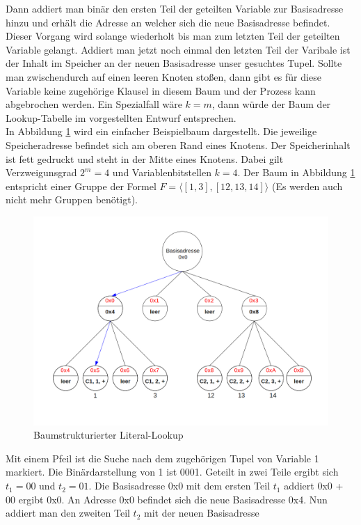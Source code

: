 Dann addiert man binär den ersten Teil der geteilten Variable zur Basisadresse hinzu und erhält
die Adresse an welcher sich die neue Basisadresse befindet. Dieser Vorgang wird solange wiederholt
bis man zum letzten Teil der geteilten Variable gelangt. Addiert man jetzt noch einmal den
letzten Teil der Varibale ist
der Inhalt im Speicher an der neuen Basisadresse unser gesuchtes Tupel. Sollte man zwischendurch auf einen 
leeren Knoten stoßen, dann gibt es für diese Variable keine zugehörige Klausel in diesem Baum
und der Prozess kann abgebrochen werden. Ein Spezialfall wäre $k = m$, dann
würde der Baum der Lookup-Tabelle im vorgestellten Entwurf entsprechen.\\
In Abbildung \ref{tree} wird ein einfacher Beispielbaum dargestellt.
Die jeweilige Speicheradresse befindet sich am oberen Rand eines Knotens.
Der Speicherinhalt ist fett gedruckt und steht in der Mitte eines Knotens. Dabei
gilt Verzweigunsgrad $2^m = 4$ und 
Variablenbitstellen $k=4$. Der Baum in Abbildung \ref{tree} entspricht
einer Gruppe der Formel $F = \langle[1,3],[12,13,14]\rangle$ 
(Es werden auch nicht mehr Gruppen benötigt).
\begin{figure}[h]
  \includegraphics[width=\textwidth]{abb/tree.png}
  \caption{Baumstrukturierter Literal-Lookup}
  \label{tree}
\end{figure}
Mit einem Pfeil ist die Suche nach dem zugehörigen Tupel von 
Variable 1 markiert. Die Binärdarstellung von 1 ist 0001. Geteilt
in zwei Teile ergibt sich $t_1 = 00$ und $t_2 = 01$. Die Basisadresse 0x0 mit dem ersten
Teil $t_1$ addiert 0x0 + 00 ergibt 0x0. An Adresse 0x0 befindet sich die neue
Basisadresse 0x4. Nun addiert man den zweiten Teil $t_2$ mit der neuen Basisadresse
